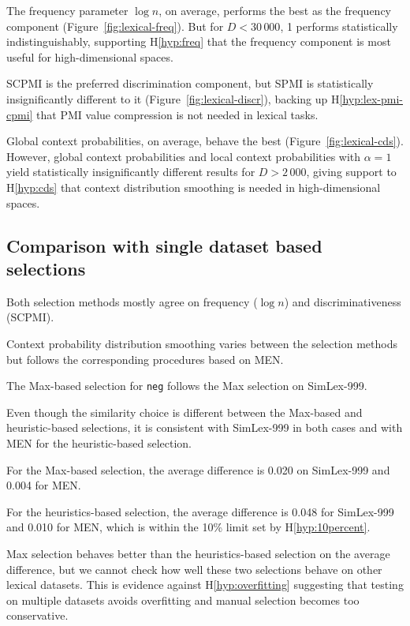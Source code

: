  The frequency parameter $\log n$, on average, performs the best as the frequency component (Figure~\ref{fig:lexical-freq}). But for $D < 30\,000$, 1 performs statistically indistinguishably, supporting H\ref{hyp:freq} that the frequency component is most useful for high-dimensional spaces.

SCPMI is the preferred discrimination component, but SPMI is statistically
insignificantly different to it (Figure~\ref{fig:lexical-discr}), backing up H\ref{hyp:lex-pmi-cpmi} that PMI value compression is not needed in lexical tasks.

 Global context probabilities, on average, behave the best (Figure~\ref{fig:lexical-cds}). However, global context probabilities and local context probabilities with $\alpha = 1$ yield statistically insignificantly different results for $D > 2\,000$, giving support to H\ref{hyp:cds} that context distribution smoothing is needed in high-dimensional spaces.

\subsection{Comparison with single dataset based selections}

Both selection methods mostly agree on frequency ($\log n$) and discriminativeness (SCPMI).

Context probability distribution smoothing varies between the selection methods but follows the corresponding procedures based on MEN.

The Max-based selection for \texttt{neg} follows the Max selection on SimLex-999.

Even though the similarity choice is different between the Max-based and heuristic-based selections, it is consistent with SimLex-999 in both cases and with MEN for the heuristic-based selection.

For the Max-based selection, the average difference is 0.020 on SimLex-999 and 0.004 for MEN.

For the heuristics-based selection, the average difference is 0.048 for SimLex-999 and 0.010 for MEN, which is within the 10\% limit set by H\ref{hyp:10percent}.

Max selection behaves better than the heuristics-based selection on the average difference, but we cannot check how well these two selections behave on other lexical datasets. This is evidence against H\ref{hyp:overfitting} suggesting that testing on multiple datasets avoids overfitting and manual selection becomes too conservative.

